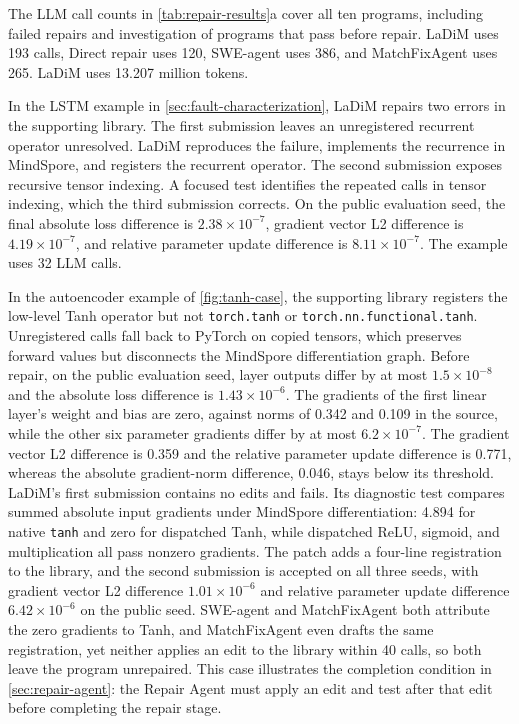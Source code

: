 \documentclass{article}
\begin{document}
The LLM call counts in \cref{tab:repair-results}a cover all ten programs, including failed repairs and investigation of programs that pass before repair. LaDiM uses 193 calls, Direct repair uses 120, SWE-agent uses 386, and MatchFixAgent uses 265. LaDiM uses 13.207 million tokens.

In the LSTM example in \cref{sec:fault-characterization}, LaDiM repairs two errors in the supporting library. The first submission leaves an unregistered recurrent operator unresolved. LaDiM reproduces the failure, implements the recurrence in MindSpore, and registers the recurrent operator. The second submission exposes recursive tensor indexing. A focused test identifies the repeated calls in tensor indexing, which the third submission corrects. On the public evaluation seed, the final absolute loss difference is $2.38\times10^{-7}$, gradient vector L2 difference is $4.19\times10^{-7}$, and relative parameter update difference is $8.11\times10^{-7}$. The example uses 32 LLM calls.

In the autoencoder example of \cref{fig:tanh-case}, the supporting library registers the low-level Tanh operator but not \texttt{torch.tanh} or \texttt{torch.nn.functional.tanh}. Unregistered calls fall back to PyTorch on copied tensors, which preserves forward values but disconnects the MindSpore differentiation graph. Before repair, on the public evaluation seed, layer outputs differ by at most $1.5\times10^{-8}$ and the absolute loss difference is $1.43\times10^{-6}$. The gradients of the first linear layer's weight and bias are zero, against norms of 0.342 and 0.109 in the source, while the other six parameter gradients differ by at most $6.2\times10^{-7}$. The gradient vector L2 difference is 0.359 and the relative parameter update difference is 0.771, whereas the absolute gradient-norm difference, 0.046, stays below its threshold. LaDiM's first submission contains no edits and fails. Its diagnostic test compares summed absolute input gradients under MindSpore differentiation: 4.894 for native \texttt{tanh} and zero for dispatched Tanh, while dispatched ReLU, sigmoid, and multiplication all pass nonzero gradients. The patch adds a four-line registration to the library, and the second submission is accepted on all three seeds, with gradient vector L2 difference $1.01\times10^{-6}$ and relative parameter update difference $6.42\times10^{-6}$ on the public seed. SWE-agent and MatchFixAgent both attribute the zero gradients to Tanh, and MatchFixAgent even drafts the same registration, yet neither applies an edit to the library within 40 calls, so both leave the program unrepaired. This case illustrates the completion condition in \cref{sec:repair-agent}: the Repair Agent must apply an edit and test after that edit before completing the repair stage.
\end{document}
